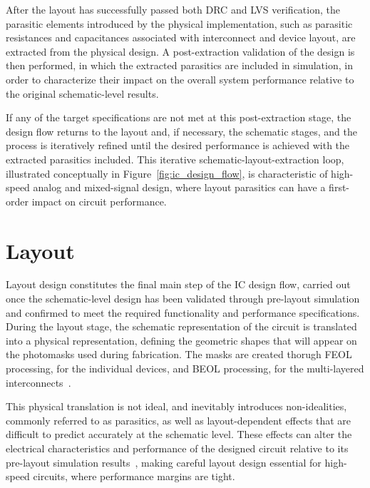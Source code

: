 After the layout has successfully passed both \ac{DRC} and \ac{LVS} verification, the parasitic elements introduced by the physical implementation, such as parasitic resistances and capacitances associated with interconnect and device layout, are extracted from the physical design. A post-extraction validation of the design is then performed, in which the extracted parasitics are included in simulation, in order to characterize their impact on the overall system performance relative to the original schematic-level results.

If any of the target specifications are not met at this post-extraction stage, the design flow returns to the layout and, if necessary, the schematic stages, and the process is iteratively refined until the desired performance is achieved with the extracted parasitics included. This iterative schematic-layout-extraction loop, illustrated conceptually in Figure~\ref{fig:ic_design_flow}, is characteristic of high-speed analog and mixed-signal design, where layout parasitics can have a first-order impact on circuit performance. %

\section{Layout} \label{sec:layout_background}

Layout design constitutes the final main step of the \ac{IC} design flow, carried out once the schematic-level design has been validated through pre-layout simulation and confirmed to meet the required functionality and performance specifications. During the layout stage, the schematic representation of the circuit is translated into a physical representation, defining the geometric shapes that will appear on the photomasks used during fabrication. The masks are created thorugh \ac{FEOL} processing, for the individual devices, and \ac{BEOL} processing, for the multi-layered interconnects~\cite{layout_fundamentals}.

This physical translation is not ideal, and inevitably introduces non-idealities, commonly referred to as parasitics, as well as layout-dependent effects that are difficult to predict accurately at the schematic level. These effects can alter the electrical characteristics and performance of the designed circuit relative to its pre-layout simulation results~\cite{layout_fundamentals, razavi}, making careful layout design essential for high-speed circuits, where performance margins are tight.

